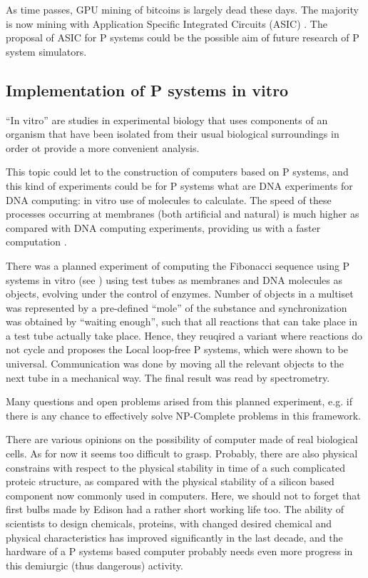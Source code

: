 As time passes, GPU mining of bitcoins is largely dead these days. The majority is now mining with Application Specific Integrated Circuits (ASIC) \cite{Smith08ASIC}. The proposal of ASIC for P systems could be the possible aim of future research of P system simulators. 


\subsection{Implementation of P systems in vitro} %
\label{sub:implementation_of_p_systems_in_vitro}

``In vitro'' are studies in experimental biology that uses components of an organism that have been isolated from their usual biological surroundings in order ot provide a more convenient analysis.

This topic could let to the construction of computers based on P systems, and this kind of experiments could be for P systems what are DNA experiments for DNA computing: in vitro use of molecules to calculate. The speed of these processes occurring at membranes (both artificial and natural) is much higher as compared with DNA computing experiments, providing us with a faster computation \cite{Ardelean06InVitro}.

There was a planned experiment of computing the Fibonacci sequence using P systems in vitro (see \cite{Gershoni:2008:InVitro}) using test tubes as membranes and DNA molecules as objects, evolving under the control of enzymes. Number of objects in a multiset was represented by a pre-defined ``mole'' of the substance and synchronization was obtained by ``waiting enough'', such that all reactions that can take place in a test tube actually take place. Hence, they reuqired a variant where reactions do not cycle and proposes the  Local loop-free P systems, which were shown to be universal. Communication was done by moving all the relevant objects to the next tube in a mechanical way. The final result was read by spectrometry.

Many questions and open problems arised from this planned experiment, e.g. if there is any chance to effectively solve NP-Complete problems in this framework. 

There are various opinions on the possibility of computer made of real biological cells. As for now it seems too difficult to grasp. Probably, there are also physical constrains with respect to the physical stability in time of a such complicated proteic structure, as compared with the physical stability of a silicon based component now commonly used in computers. Here, we should not to forget that first bulbs made by Edison had a rather short working life too. The ability of scientists to design chemicals, proteins, with changed desired chemical and physical characteristics has improved significantly in the last decade, and the hardware of a P systems based computer probably needs even more progress in this demiurgic (thus dangerous) activity.

